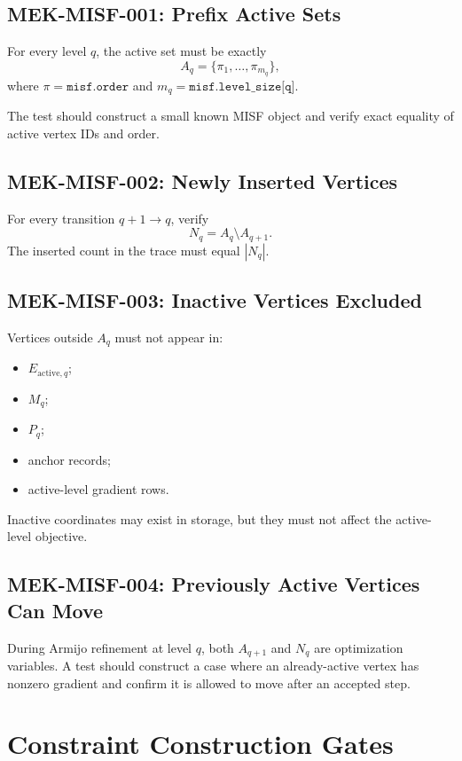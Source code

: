 \documentclass[11pt]{article}
\begin{document}
\subsection{MEK-MISF-001: Prefix Active Sets}

For every level \(q\), the active set must be exactly
\[
  A_q = \{\pi_1,\ldots,\pi_{m_q}\},
\]
where \(\pi=\texttt{misf.order}\) and \(m_q=\texttt{misf.level\_size[q]}\).

The test should construct a small known MISF object and verify exact equality
of active vertex IDs and order.

\subsection{MEK-MISF-002: Newly Inserted Vertices}

For every transition \(q+1\to q\), verify
\[
  N_q = A_q\setminus A_{q+1}.
\]
The inserted count in the trace must equal \(|N_q|\).

\subsection{MEK-MISF-003: Inactive Vertices Excluded}

Vertices outside \(A_q\) must not appear in:
\begin{itemize}[leftmargin=2em]
  \item \(E_{\mathrm{active},q}\);
  \item \(M_q\);
  \item \(P_q\);
  \item anchor records;
  \item active-level gradient rows.
\end{itemize}

Inactive coordinates may exist in storage, but they must not affect the
active-level objective.

\subsection{MEK-MISF-004: Previously Active Vertices Can Move}

During Armijo refinement at level \(q\), both \(A_{q+1}\) and \(N_q\) are
optimization variables. A test should construct a case where an already-active
vertex has nonzero gradient and confirm it is allowed to move after an accepted
step.

\section{Constraint Construction Gates}
\end{document}
